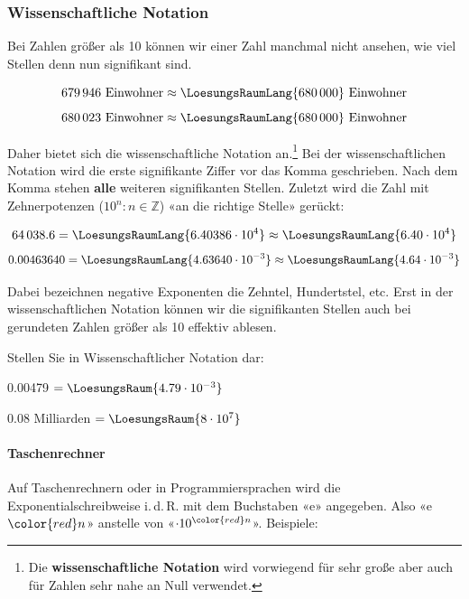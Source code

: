 
  
\subsubsection{Wissenschaftliche Notation}\label{wissenschaftlicheNotation}
Bei Zahlen größer als 10 können wir einer Zahl manchmal nicht ansehen, wie viel Stellen denn nun signifikant sind.

$$ 679\,946 \textrm{\ Einwohner} \approx  \LoesungsRaumLang{680\,000} \textrm{\ Einwohner}$$
$$ 680\,023 \textrm{\ Einwohner} \approx  \LoesungsRaumLang{680\,000} \textrm{\ Einwohner}$$

Daher bietet sich die wissenschaftliche Notation an.\footnote{Die
\textbf{wissenschaftliche Notation} wird vorwiegend für sehr große
aber auch für Zahlen sehr nahe an Null verwendet.}
Bei der wissenschaftlichen Notation wird die erste signifikante Ziffer
vor das Komma geschrieben. Nach dem Komma stehen \textbf{alle} weiteren signifikanten Stellen.
Zuletzt wird die Zahl mit Zehnerpotenzen
($10^{n}: n \in \mathbb{Z}$) «an die richtige Stelle» gerückt:

$$64\,038.6  = \LoesungsRaumLang{6.40386 \cdot 10^{ 4}} \approx \LoesungsRaumLang{6.40 \cdot 10^{ 4}}$$
$$0.00463640 = \LoesungsRaumLang{4.63640 \cdot 10^{-3}} \approx \LoesungsRaumLang{4.64 \cdot 10^{-3}}$$

Dabei bezeichnen negative Exponenten die Zehntel, Hundertstel, etc.
Erst in der wissenschaftlichen Notation können wir die signifikanten Stellen auch bei gerundeten Zahlen größer als 10 effektiv ablesen.


Stellen Sie in Wissenschaftlicher Notation dar:

0.00479 $= \LoesungsRaum{4.79 \cdot{}10^{-3}}$

0.08 Milliarden $= \LoesungsRaum{8\cdot{}10^7}$

\newpage

\paragraph{Taschenrechner} Auf Taschenrechnern oder in
Programmiersprachen wird die Exponentialschreibweise i.\,d.\,R. mit dem
Buchstaben «e» angegeben. Also «e$\color{red}n$» anstelle von «$\cdot10^{\color{red}n}$». Beispiele:

